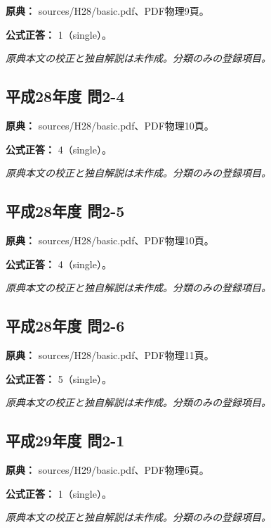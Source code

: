 \noindent\textbf{原典：} sources/H28/basic.pdf、PDF物理9頁。

\textbf{公式正答：} 1（single）。

\par\textit{原典本文の校正と独自解説は未作成。分類のみの登録項目。}

\subsection{平成28年度 問2-4}
\label{q:h28-reg-basic-2-4}

\noindent\textbf{原典：} sources/H28/basic.pdf、PDF物理10頁。

\textbf{公式正答：} 4（single）。

\par\textit{原典本文の校正と独自解説は未作成。分類のみの登録項目。}

\subsection{平成28年度 問2-5}
\label{q:h28-reg-basic-2-5}

\noindent\textbf{原典：} sources/H28/basic.pdf、PDF物理10頁。

\textbf{公式正答：} 4（single）。

\par\textit{原典本文の校正と独自解説は未作成。分類のみの登録項目。}

\subsection{平成28年度 問2-6}
\label{q:h28-reg-basic-2-6}

\noindent\textbf{原典：} sources/H28/basic.pdf、PDF物理11頁。

\textbf{公式正答：} 5（single）。

\par\textit{原典本文の校正と独自解説は未作成。分類のみの登録項目。}

\subsection{平成29年度 問2-1}
\label{q:h29-reg-basic-2-1}

\noindent\textbf{原典：} sources/H29/basic.pdf、PDF物理6頁。

\textbf{公式正答：} 1（single）。

\par\textit{原典本文の校正と独自解説は未作成。分類のみの登録項目。}

